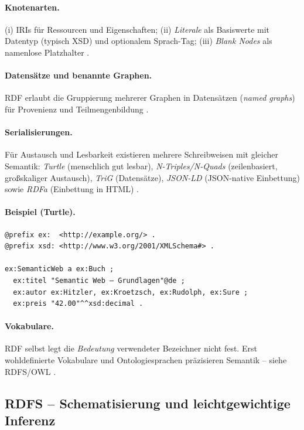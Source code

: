 \paragraph{Knotenarten.} (i) IRIs für Ressourcen und Eigenschaften; (ii) \emph{Literale} als Basiswerte mit Datentyp (typisch XSD) und optionalem Sprach-Tag; (iii) \emph{Blank Nodes} als namenlose Platzhalter \cite{RDF11Primer}.

\paragraph{Datensätze und benannte Graphen.} RDF erlaubt die Gruppierung mehrerer Graphen in Datensätzen (\emph{named graphs}) für Provenienz und Teilmengenbildung \cite{RDF11Primer}.

\paragraph{Serialisierungen.} Für Austausch und Lesbarkeit existieren mehrere Schreibweisen mit gleicher Semantik: \emph{Turtle} (menschlich gut lesbar), \emph{N-Triples/N-Quads} (zeilenbasiert, großskaliger Austausch), \emph{TriG} (Datensätze), \emph{JSON-LD} (JSON-native Einbettung) sowie \emph{RDFa} (Einbettung in HTML) \cite{RDF11Primer}.

\paragraph{Beispiel (Turtle).}
\begin{lstlisting}
@prefix ex:  <http://example.org/> .
@prefix xsd: <http://www.w3.org/2001/XMLSchema#> .

ex:SemanticWeb a ex:Buch ;
  ex:titel "Semantic Web – Grundlagen"@de ;
  ex:autor ex:Hitzler, ex:Kroetzsch, ex:Rudolph, ex:Sure ;
  ex:preis "42.00"^^xsd:decimal .
\end{lstlisting}

\paragraph{Vokabulare.} RDF selbst legt die \emph{Bedeutung} verwendeter Bezeichner nicht fest. Erst wohldefinierte Vokabulare und Ontologiesprachen präzisieren Semantik -- siehe RDFS/OWL \cite{Hitzler,AntoniouVanHarmelen}.

\subsection{RDFS -- Schematisierung und leichtgewichtige Inferenz}

